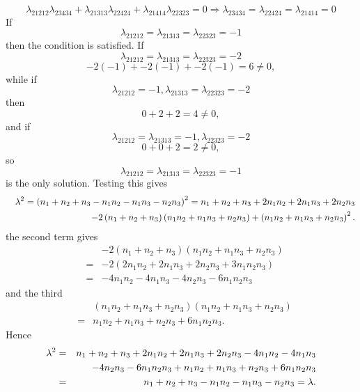 \documentclass[12pt]{article}
\begin{document}
\begin{equation}
\lambda _{21212}\lambda _{23434}+\lambda _{21313}\lambda _{22424}+\lambda
_{21414}\lambda _{22323}=0\Rightarrow \lambda _{23434}=\lambda
_{22424}=\lambda _{21414}=0
\end{equation}%
If 
\begin{equation}
\lambda _{21212}=\lambda _{21313}=\lambda _{22323}=-1
\end{equation}%
then the condition is satisfied. If 
\begin{equation}
\lambda _{21212}=\lambda _{21313}=\lambda _{22323}=-2
\end{equation}%
\begin{equation}
-2\left( -1\right) +-2\left( -1\right) +-2\left( -1\right) =6\neq 0,
\end{equation}%
while if 
\begin{equation}
\lambda _{21212}=-1,\lambda _{21313}=\lambda _{22323}=-2
\end{equation}%
then 
\begin{equation}
0+2+2=4\neq 0,
\end{equation}%
and if 
\begin{equation}
\lambda _{21212}=\lambda _{21313}=-1,\lambda _{22323}=-2
\end{equation}%
\begin{equation}
0+0+2=2\neq 0,
\end{equation}%
so 
\begin{equation}
\lambda _{21212}=\lambda _{21313}=\lambda _{22323}=-1
\end{equation}%
is the only solution. Testing this gives 
\begin{eqnarray}
&&\lambda ^{2}=\left(
n_{1}+n_{2}+n_{3}-n_{1}n_{2}-n_{1}n_{3}-n_{2}n_{3}\right)
^{2}=n_{1}+n_{2}+n_{3}+2n_{1}n_{2}+2n_{1}n_{3}+2n_{2}n_{3}  \notag \\
&&-2\left( n_{1}+n_{2}+n_{3}\right) \left(
n_{1}n_{2}+n_{1}n_{3}+n_{2}n_{3}\right) +\left(
n_{1}n_{2}+n_{1}n_{3}+n_{2}n_{3}\right) ^{2}.  \notag
\end{eqnarray}%
the second term gives%
\begin{eqnarray}
&&-2\left( n_{1}+n_{2}+n_{3}\right) \left(
n_{1}n_{2}+n_{1}n_{3}+n_{2}n_{3}\right) \\
&=&-2\left( 2n_{1}n_{2}+2n_{1}n_{3}+2n_{2}n_{3}+3n_{1}n_{2}n_{3}\right) \\
&=&-4n_{1}n_{2}-4n_{1}n_{3}-4n_{2}n_{3}-6n_{1}n_{2}n_{3}
\end{eqnarray}%
and the third%
\begin{eqnarray}
&&\left( n_{1}n_{2}+n_{1}n_{3}+n_{2}n_{3}\right) \left(
n_{1}n_{2}+n_{1}n_{3}+n_{2}n_{3}\right) \\
&=&n_{1}n_{2}+n_{1}n_{3}+n_{2}n_{3}+6n_{1}n_{2}n_{3}.
\end{eqnarray}%
Hence 
\begin{eqnarray}
\lambda ^{2}
&=&n_{1}+n_{2}+n_{3}+2n_{1}n_{2}+2n_{1}n_{3}+2n_{2}n_{3}-4n_{1}n_{2}-4n_{1}n_{3}
\notag \\
&&-4n_{2}n_{3}-6n_{1}n_{2}n_{3}+n_{1}n_{2}+n_{1}n_{3}+n_{2}n_{3}+6n_{1}n_{2}n_{3}
\notag \\
&=&n_{1}+n_{2}+n_{3}-n_{1}n_{2}-n_{1}n_{3}-n_{2}n_{3}=\lambda .
\end{eqnarray}
\end{document}
